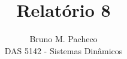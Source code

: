 \documentclass[a4paper]{report}
\begin{document}
\title{Relatório 8}
\author{Bruno M. Pacheco\\
DAS 5142 - Sistemas Dinâmicos}
 
\maketitle


\end{document}
